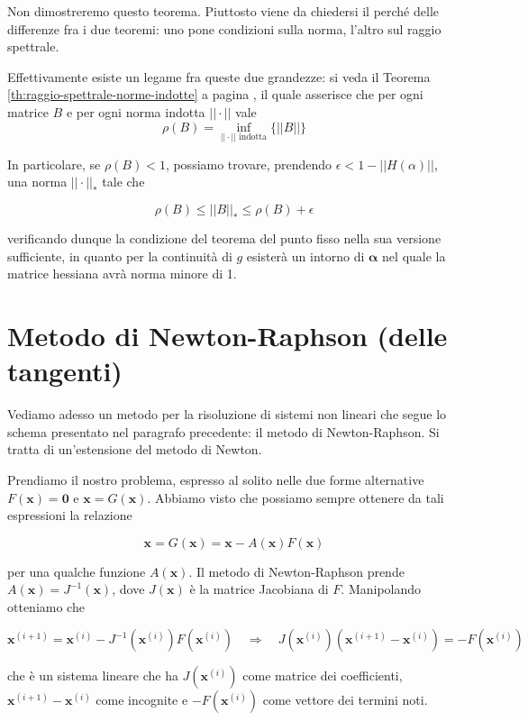 Non dimostreremo questo teorema. Piuttosto viene da chiedersi il
perch\'e delle differenze fra i due teoremi: uno pone condizioni sulla
norma, l'altro sul raggio spettrale.

Effettivamente esiste un legame fra queste due grandezze: si veda il Teorema \ref{th:raggio-spettrale-norme-indotte} a pagina \pageref{th:raggio-spettrale-norme-indotte}, il quale asserisce che per ogni matrice $B$ e per ogni norma indotta $|| \cdot ||$ vale
$$ \rho(B) = \inf_{|| \cdot || \text{ indotta}}\{ ||B||\}$$

In particolare, se $ \rho(B) < 1 $, possiamo trovare, prendendo $
\epsilon < 1 - || H(\alpha) || $, una norma $ ||\cdot||_* $ tale che

$$ \rho(B) \leq || B||_* \leq \rho(B) + \epsilon$$

verificando dunque la condizione del teorema del punto fisso nella sua
versione sufficiente, in quanto per la continuit\`a di $g$ esister\`a un
intorno di $ \mathbf{\alpha} $ nel quale la matrice hessiana avr\`a norma
minore di 1.


\section{Metodo di Newton-Raphson (delle tangenti)}
\label{section:metodo-newton-raphson}
Vediamo adesso un metodo per la risoluzione di sistemi non
lineari che segue lo schema presentato nel paragrafo precedente: il metodo di Newton-Raphson. Si tratta di un'estensione del
metodo di Newton.

Prendiamo il nostro problema, espresso al solito nelle due forme
alternative $ F(\mathbf{x}) = \mathbf{0} $ e 
$ \mathbf{x} = G(\mathbf{x}) $. Abbiamo visto che possiamo
sempre ottenere da tali espressioni la relazione

\[ \mathbf{x} = G(\mathbf{x}) = \mathbf{x} -
A(\mathbf{x})F(\mathbf{x}) \]

per una qualche funzione $A(\mathbf{x})$. Il metodo di Newton-Raphson prende $A(\mathbf{x}) = J^{-1}(\mathbf{x}) $, dove 
$J(\mathbf{x})$ \`e la matrice Jacobiana di $F$. Manipolando
otteniamo che

\[ \mathbf{x}^{(i+1)} = \mathbf{x}^{(i)} - J^{-1}(\mathbf{x}^{(i)})F(\mathbf{x}^{(i)}) \quad \Rightarrow \quad J(\mathbf{x}^{(i)})(\mathbf{x}^{(i+1)} - \mathbf{x}^{(i)}) = - F(\mathbf{x}^{(i)}) \]

che \`e un sistema lineare che ha $ J(\mathbf{x}^{(i)}) $ come matrice dei
coefficienti, $ \mathbf{x}^{(i+1)} - \mathbf{x}^{(i)} $ come incognite e $ - F(\mathbf{x}^{(i)})$ come vettore dei termini noti.

